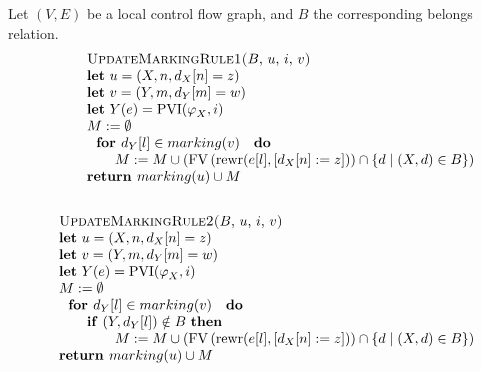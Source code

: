 Let $\left( V,E\right) $ be a local control flow graph, and $B$ the
corresponding belongs relation.%
\begin{eqnarray*}
&&%
\begin{tabular}{l}
\textsc{UpdateMarkingRule1(}$B$, $u$, $i$, $v$\textsc{)} \\ 
\textbf{let} $u=\left( X,n,d_{X}[n]=z\right) $ \\ 
\textbf{let} $v=\left( Y,m,d_{Y}[m]=w\right) $ \\ 
\textbf{let} $Y(e)=\mathrm{PVI}(\varphi _{X},i)$ \\ 
$M:=\emptyset $ \\ 
$\text{\textbf{for }}d_{Y}[l]\in marking(v)\text{ \textbf{do}}$ \\ 
$\qquad M:=M\cup \left( \mathrm{FV}\left( \mathrm{rewr}(e[l],\left[
d_{X}[n]:=z\right] )\right) \cap \{d\mid (X,d)\in B\}\right) $ \\ 
\textbf{return }$marking(u)\cup M$%
\end{tabular}
\\
&& \\
&&%
\begin{tabular}{l}
\textsc{UpdateMarkingRule2(}$B$, $u$, $i$, $v$\textsc{)} \\ 
\textbf{let} $u=\left( X,n,d_{X}[n]=z\right) $ \\ 
\textbf{let} $v=\left( Y,m,d_{Y}[m]=w\right) $ \\ 
\textbf{let} $Y(e)=\mathrm{PVI}(\varphi _{X},i)$ \\ 
$M:=\emptyset $ \\ 
$\text{\textbf{for }}d_{Y}[l]\in marking(v)\text{ \textbf{do}}$ \\ 
$\qquad $\textbf{if} $\left( Y,d_{Y}[l]\right) \notin B$ \textbf{then} \\ 
$\qquad \qquad M:=M\cup \left( \mathrm{FV}\left( \mathrm{rewr}(e[l],\left[
d_{X}[n]:=z\right] )\right) \cap \{d\mid (X,d)\in B\}\right) $ \\ 
\textbf{return }$marking(u)\cup M$%
\end{tabular}%
\end{eqnarray*}

